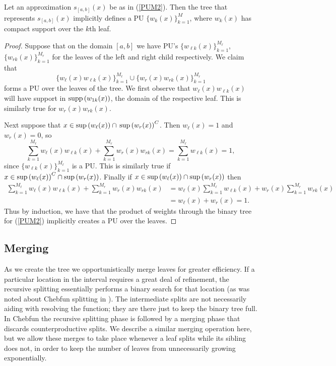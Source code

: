 \begin{thm}
Let an approximation $s_{[a,b]}(x)$ be as in (\ref{PUM2}). Then the tree that represents $s_{[a,b]}(x)$ implicitly defines a PU $\{w_k(x)\}_{k=1}^M$, where $w_k(x)$ has compact support over the $k$th leaf.
\label{PU_Proof}
\end{thm}
\begin{proof}
Suppose that on the domain $[a,b]$ we have PU's $\{w_{\ell k}(x)\}_{k=1}^{M_\ell}$, $\{w_{rk}(x)\}_{k=1}^{M_r}$ for the leaves of the left and right child respectively. We claim that
\begin{equation}
\{w_{\ell}(x) w_{\ell k}(x)\}_{k=1}^{M_\ell} \cup \{w_r(x) w_{r k}(x)\}_{k=1}^{M_r}
\label{UNPU}
\end{equation}
forms a PU over the leaves of the tree. We first observe that $w_{\ell}(x)w_{\ell k}(x)$ will have support in $\mathop{\rm supp} \left( w_{1k}(x) \right)$, the domain of the respective leaf. This is similarly true for $w_{r}(x)w_{r k}(x)$.


Next suppose that $x \in \sup \left( w_{\ell}(x)\right) \cap \, \sup \left( w_{r}(x)\right)^C$. Then $w_{\ell}(x)=1$ and $w_r(x)=0$, so
\begin{equation}
\sum_{k=1}^{M_\ell} w_{\ell}(x) w_{\ell k}(x)+ \sum_{k=1}^{M_r} w_{r}(x) w_{r k}(x) = \sum_{k=1}^{M_\ell} w_{\ell k}(x) = 1,
\end{equation}
since $\{w_{\ell k}(x)\}_{k=1}^{M_\ell}$ is a PU. This is similarly true if $x \in \sup \left( w_{\ell}(x)\right)^C \cap \sup \left( w_{r}(x)\right)$. Finally if $x \in \sup \left( w_{\ell}(x)\right) \cap \sup \left( w_{r}(x)\right)$ then
\begin{equation}
\begin{aligned}
\sum_{k=1}^{M_\ell} w_{\ell}(x) w_{\ell k}(x)+ \sum_{k=1}^{M_r} w_{r}(x) w_{r k}(x) &=  w_{\ell}(x) \sum_{k=1}^{M_\ell}  w_{\ell k}(x)+ w_{r}(x) \sum_{k=1}^{M_r} w_{r k}(x) \\
&= w_{\ell}(x)+w_{r}(x)=1.
\end{aligned}
\end{equation}
Thus by induction, we have that the product of weights through the binary tree for (\ref{PUM2}) implicitly creates a PU over the leaves.
\end{proof}


\subsection{Merging}
\label{Merging_sec}
As we create the tree we opportunistically merge leaves for greater efficiency. If a particular location in the interval requires a great deal of refinement, the recursive splitting essentially performs a binary search for that location (as was noted about Chebfun splitting in \cite{driscoll2014optimal}). The intermediate splits are not necessarily aiding with resolving the function; they are there just to keep the binary tree full. In Chebfun the recursive splitting phase is followed by a merging phase that discards counterproductive splits. We describe a similar merging operation here, but we allow these merges to take place whenever a leaf splits while its sibling does not, in order to keep the number of leaves from unnecessarily growing exponentially.

